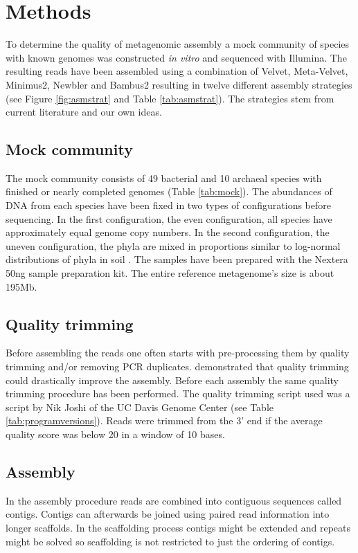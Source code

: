 \documentclass[a4paper,12pt]{article}
\begin{document}
\section{Methods} To determine the quality of metagenomic assembly a mock
community of species with known genomes was constructed {\em in vitro} and
sequenced with Illumina. The resulting reads have been assembled using a
combination of Velvet, Meta-Velvet, Minimus2, Newbler and Bambus2 resulting in
twelve different assembly strategies (see Figure \ref{fig:asmstrat} and Table
\ref{tab:asmstrat}). The strategies stem from current literature and our own
ideas.

\subsection{Mock community} The mock community consists of 49 bacterial and 10
archaeal species with finished or nearly completed genomes (Table
\ref{tab:mock}). The abundances of DNA from each species have been fixed in two
types of configurations before sequencing. In the first configuration, the even
configuration, all species have approximately equal genome copy numbers. In the
second configuration, the uneven configuration, the phyla are mixed in
proportions similar to log-normal distributions of phyla in soil \cite{Doroghazi18682841}. The samples
have been prepared with the Nextera 50ng sample preparation kit. The entire
reference metagenome's size is about 195Mb.


\subsection{Quality trimming} Before assembling the reads one often starts with
pre-processing them by quality trimming and/or removing PCR duplicates.
\citet{Mende22384016} demonstrated that quality trimming could drastically
improve the assembly. Before each assembly the same quality trimming procedure
has been performed. The quality trimming script used was a script by Nik Joshi
of the UC Davis Genome Center (see Table \ref{tab:programversions}).  Reads
were trimmed from the 3' end if the average quality score was below 20 in a
window of 10 bases.

\subsection{Assembly} In the assembly procedure reads are combined into
contiguous sequences called contigs. Contigs can afterwards be joined using
paired read information into longer scaffolds. In the scaffolding process
contigs might be extended and repeats might be solved so scaffolding is not
restricted to just the ordering of contigs.\\
\end{document}
